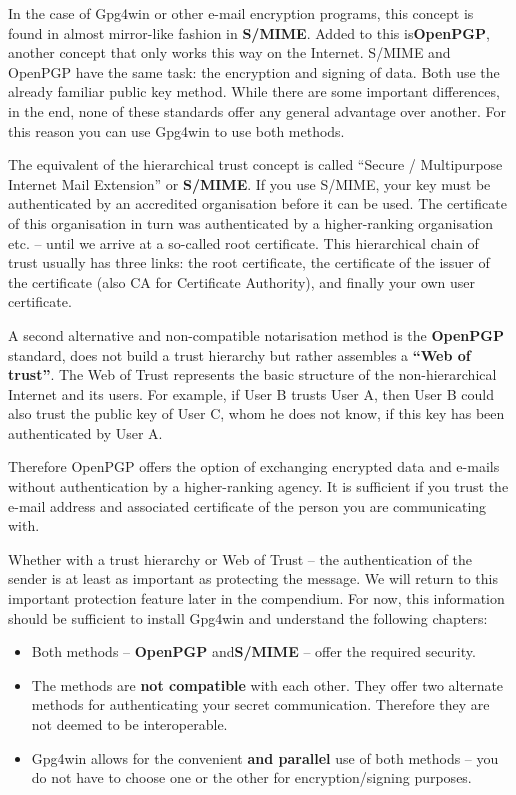 \documentclass[a4paper,11pt,oneside,openright,titlepage]{scrbook}
\newcommand{\Email}{e-mail}
\begin{document}
In the case of Gpg4win or other \Email{} encryption programs,
 this concept is found in almost mirror-like fashion in
\textbf{S/MIME}. Added to this is\textbf{OpenPGP}, another concept
that only works this way on the Internet.  S/MIME and OpenPGP have the
same task: the encryption and signing of data.  Both use the already
familiar public key method.  While there are some important
differences, in the end, none of these standards offer any general
advantage over another. For this reason you can use Gpg4win to use
both methods.


\clearpage
The equivalent of the hierarchical trust concept is called ``Secure /
Multipurpose Internet Mail Extension'' or \textbf{S/MIME}. If you use
S/MIME, your key must be authenticated by an accredited
organisation before it can be used. The certificate of this
organisation in turn was authenticated by a higher-ranking
organisation etc. -- until we arrive at a so-called root certificate.
This hierarchical chain of trust usually has three links: the root
certificate, the certificate of the issuer of the
certificate (also CA for Certificate Authority), and finally your own user
certificate.

A second alternative and non-compatible notarisation method is the
\textbf{OpenPGP} standard, does not build a trust hierarchy but rather
assembles a \textbf{``Web of trust''}.
The Web of Trust represents the basic structure of the
non-hierarchical Internet and its users. For example, if User B trusts
User A, then User B could also trust the public key of User C, whom he
does not know, if this key has been authenticated by User A.

Therefore OpenPGP offers the option of exchanging encrypted data and
\Email{}s without authentication by a higher-ranking agency. It is
sufficient if you trust the \Email{} address and
associated certificate of the person you are communicating with.

Whether with a trust hierarchy or Web of Trust -- the authentication
of the sender is at least as important as protecting the message. We
will return to this important protection feature later in the
compendium. For now, this information should be sufficient to install
Gpg4win and understand the following chapters:

\begin{itemize}
    \item Both methods -- \textbf{OpenPGP} and\textbf{S/MIME} --
        offer the required security.
    \item The methods are \textbf{not compatible} with each other.
        They offer two alternate methods for authenticating your
        secret communication. Therefore they are not deemed to be
        interoperable.
    \item Gpg4win allows for the convenient \textbf{and parallel} use
        of both methods -- you do not have to choose one or the other
        for encryption/signing purposes.
\end{itemize}
\end{document}
